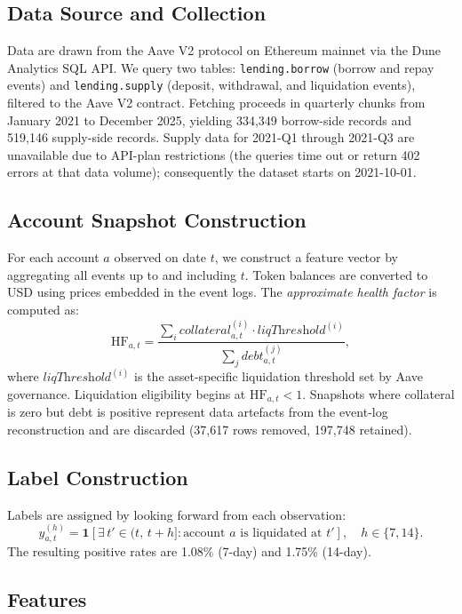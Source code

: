 \documentclass[12pt,a4paper]{article}
\newcommand{\HF}{\mathrm{HF}}
\begin{document}
\subsection{Data Source and Collection}

Data are drawn from the Aave V2 protocol on Ethereum mainnet via the Dune
Analytics SQL API.  We query two tables: \texttt{lending.borrow} (borrow and
repay events) and \texttt{lending.supply} (deposit, withdrawal, and
liquidation events), filtered to the Aave V2 contract.  Fetching proceeds in
quarterly chunks from January 2021 to December 2025, yielding 334{,}349
borrow-side records and 519{,}146 supply-side records.  Supply data for
2021-Q1 through 2021-Q3 are unavailable due to API-plan restrictions (the
queries time out or return 402 errors at that data volume); consequently the
dataset starts on 2021-10-01.

\subsection{Account Snapshot Construction}

For each account $a$ observed on date $t$, we construct a feature vector by
aggregating all events up to and including $t$.  Token balances are converted
to USD using prices embedded in the event logs.  The \emph{approximate health
factor} is computed as:
\[
    \HF_{a,t} = \frac{\displaystyle\sum_{i}
    \textit{collateral}_{a,t}^{(i)} \cdot \textit{liqThreshold}^{(i)}}
    {\displaystyle\sum_{j} \textit{debt}_{a,t}^{(j)}},
\]
where $\textit{liqThreshold}^{(i)}$ is the asset-specific liquidation
threshold set by Aave governance.  Liquidation eligibility begins at
$\HF_{a,t} < 1$.  Snapshots where collateral is zero but debt is positive
represent data artefacts from the event-log reconstruction and are discarded
(37{,}617 rows removed, 197{,}748 retained).

\subsection{Label Construction}

Labels are assigned by looking forward from each observation:
\[
    y_{a,t}^{(h)} = \mathbf{1}\!\left[\exists\, t' \in
    (t,\, t+h] : \text{account } a \text{ is liquidated at } t'\right],
    \quad h \in \{7, 14\}.
\]
The resulting positive rates are 1.08\% (7-day) and 1.75\% (14-day).

\subsection{Features}
\end{document}
